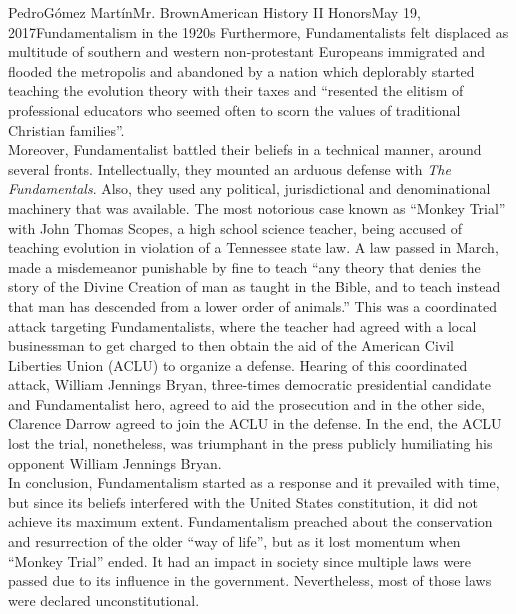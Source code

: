 \documentclass[12pt, letterpaper]{article}
\begin{document}
\begin{mla}{Pedro}{G\'{o}mez Mart\'{i}n}{Mr. Brown}{American History II Honors}{May 19, 2017}{Fundamentalism in the 1920s}
  Furthermore, Fundamentalists felt displaced as multitude of southern and western non-protestant Europeans immigrated and flooded the metropolis and abandoned by a nation which deplorably started teaching the evolution theory with their taxes and “resented the elitism of professional educators who seemed often to scorn the values of traditional Christian families”.\parencite{RiseFundamentalism}\\
  Moreover, Fundamentalist battled their beliefs in a technical manner, around several fronts. Intellectually, they mounted an arduous defense with \textit{The Fundamentals}. Also, they used any political, jurisdictional and denominational machinery that was available. The most notorious case known as “Monkey Trial” with John Thomas Scopes, a high school science teacher, being accused of teaching evolution in violation of a Tennessee state law. A law passed in March, made a misdemeanor punishable by fine to teach “any theory that denies the story of the Divine Creation of man as taught in the Bible, and to teach instead that man has descended from a lower order of animals.”\parencite{MonkeyTrial} This was a coordinated attack targeting Fundamentalists, where the teacher had agreed with a local businessman to get charged to then obtain the aid of the American Civil Liberties Union (ACLU) to organize a defense. Hearing of this coordinated attack, William Jennings Bryan, three-times democratic presidential candidate and Fundamentalist hero, agreed to aid the prosecution and in the other side, Clarence Darrow agreed to join the ACLU in the defense. In the end, the ACLU lost the trial, nonetheless, was triumphant in the press publicly humiliating his opponent William Jennings Bryan.\\
  In conclusion, Fundamentalism started as a response and it prevailed with time, but since its beliefs interfered with the United States constitution, it did not achieve its maximum extent. Fundamentalism preached about the conservation and resurrection of the older ``way of life'', but as it lost momentum when ``Monkey Trial'' ended. It had an impact in society since multiple laws were passed due to its influence in the government. Nevertheless, most of those laws were declared unconstitutional.
  \pagebreak
\printbibliography
\end{mla}
\end{document}
